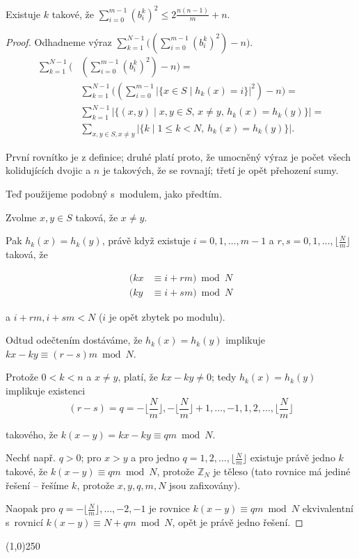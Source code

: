 \documentclass[a4paper,12pt]{article}
\newenvironment{myproof}{
  \begin{proof}
    
  }{
  \end{proof}
  \begin{center}
   \line(1,0){250}
   \end{center}
  }
\begin{document}
\begin{lemma}
    Existuje $k$ takové, že $\sum_{i=0}^{m-1}(b_i^
    k)^2\le 2\frac {n(n-1)}m+n$.
\end{lemma}
\begin{myproof}

Odhadneme výraz $\sum_{k=1}^{N-1}\big((\sum_{
i=0}^{m-1}(b_i^k)^2)-n\big)$.
\begin{align*}\sum_{k=1}^{N-1}\big(&(\sum_{i=0}^{m-1}(b_i^k)^2)-n\big)=\\
&\sum_{k=1}^{N-1}\big((\sum_{i=0}^{m-1}|\{x\in S\mid h_k(x)=i\}|^
2)-n\big)=\\
&\sum_{k=1}^{N-1}|\{(x,y)\mid x,y\in S,\,x\ne y,\,h_k(x)=h_k(y)\}
|=\\
&\sum_{x,y\in S,x\ne y}|\{k\mid 1\le k<N,\,h_k(x)=h_k(y)\}|.\end{align*}

První rovnítko je z definice; druhé platí proto, že umocněný výraz je počet všech kolidujících dvojic a $n$ je takových, že se rovnají; třetí je opět přehození sumy.

Teď použijeme podobný  s~modulem, jako předtím.

Zvolme $x,y\in S$ taková, že $x\ne y$. 

Pak $h_k(x)=h_k(y)$, 
právě když existuje $i=0,1,\dots,m-1$ a $r,s=0,1,\dots,\lfloor\frac 
Nm\rfloor$ 
taková, že 

\begin{align*}(kx&\equiv i+rm)\bmod N\\
(ky&\equiv i+sm)\bmod N\end{align*}

a $i+rm,i+sm<N$ ($i$ je opět zbytek po modulu).

Odtud odečtením dostáváme, že $h_k(x)=h_k(y)$ implikuje $
kx-ky\equiv (r-s)m\bmod N$.


Protože $0<k<n$ a $x\ne y$, platí, že $kx-ky\ne 0$; tedy 
$h_k(x)=h_k(y)$ implikuje existenci 
$$(r-s)=q=-\lfloor\frac Nm\rfloor ,-\lfloor\frac Nm\rfloor +1,\dots,-1,1
,2,\dots,\lfloor\frac Nm\rfloor$$

takového, že 
$k(x-y)=kx-ky\equiv qm\bmod N$.

Nechť např. $q>0$; pro $x>y$ a pro jedno $q=1,2,\dots,\lfloor\frac Nm\rfloor$ e\-xis\-tuje 
právě jedno $k$ takové, že $k(x-y)\equiv qm\bmod N$, protože 
$\mathbb Z_N$ je těleso (tato rovnice má jediné řešení -- řešíme $k$, protože $x,y,q,m,N$ jsou zafixovány). 


Naopak pro $q=-\lfloor\frac Nm\rfloor ,\dots,-2,-1$ je rovnice $
k(x-y)\equiv qm\bmod N$ 
ekvivalentní s~rovnicí $k(x-y)\equiv N+qm\bmod N$, opět je právě jedno řešení.


\end{myproof}
\end{document}
